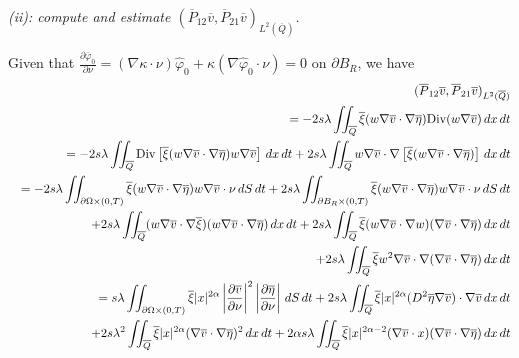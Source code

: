 \documentclass[11pt]{article}
\numberwithin{equation}{section}
\begin{document}
{\it (ii): compute and estimate $(\overline{P}_{12} \overline{v}, \overline{P}_{21} \overline{v})_{L^2(\overline{Q})}$.}

Given that $\frac{\partial \overline{\varphi}_0}{\partial \nu} = (\nabla \kappa \cdot \nu) \widehat{\varphi}_0 + \kappa (\nabla \widehat{\varphi}_0 \cdot \nu) = 0$ on $\partial B_R$, we have
\begin{eqnarray*}
	&&(\overline{P}_{12} \overline{v}, \overline{P}_{21} \overline{v})_{L^2(\overline{Q})}\\
	&&= -2s\lambda \iint_{\overline{Q}} \overline{\xi} (w \nabla \overline{v} \cdot \nabla \overline{\eta}) \text{Div}(w \nabla \overline{v}) \, dx \, dt\\
	&&= -2s\lambda \iint_{\overline{Q}} \text{Div} \left[\overline{\xi} (w \nabla \overline{v} \cdot \nabla \overline{\eta}) w \nabla \overline{v}\right] \, dx \, dt + 2s\lambda \iint_{\overline{Q}} w \nabla \overline{v} \cdot \nabla \left[\overline{\xi} (w \nabla \overline{v} \cdot \nabla \overline{\eta})\right] \, dx \, dt\\
	&&= -2s\lambda \iint_{\partial \Omega \times (0,T)} \overline{\xi} (w \nabla \overline{v} \cdot \nabla \overline{\eta}) w \nabla \overline{v} \cdot \nu \, dS \, dt + 2s\lambda \iint_{\partial B_R \times (0,T)} \overline{\xi} (w \nabla \overline{v} \cdot \nabla \overline{\eta}) w \nabla \overline{v} \cdot \nu \, dS \, dt\\
	&&\hspace{4.5mm} + 2s\lambda \iint_{\overline{Q}} (w \nabla \overline{v} \cdot \nabla \overline{\xi}) (w \nabla \overline{v} \cdot \nabla \overline{\eta}) \, dx \, dt + 2s\lambda \iint_{\overline{Q}} \overline{\xi} (w \nabla \overline{v} \cdot \nabla w) (\nabla \overline{v} \cdot \nabla \overline{\eta}) \, dx \, dt\\
	&&\hspace{4.5mm} + 2s\lambda \iint_{\overline{Q}} \overline{\xi} w^2 \nabla \overline{v} \cdot \nabla (\nabla \overline{v} \cdot \nabla \overline{\eta}) \, dx \, dt\\
	&&= s\lambda \iint_{\partial \Omega \times (0,T)} \overline{\xi} |x|^{2\alpha} \left|\frac{\partial \overline{v}}{\partial \nu}\right|^2 \left|\frac{\partial \overline{\eta}}{\partial \nu}\right| \, dS \, dt + 2s\lambda \iint_{\overline{Q}} \overline{\xi} |x|^{2\alpha} (D^2 \overline{\eta} \nabla \overline{v}) \cdot \nabla \overline{v} \, dx \, dt\\
	&&\hspace{4.5mm} + 2s\lambda^2 \iint_{\overline{Q}} \overline{\xi} |x|^{2\alpha} (\nabla \overline{v} \cdot \nabla \overline{\eta})^2 \, dx \, dt + 2\alpha s\lambda \iint_{\overline{Q}} \overline{\xi} |x|^{2\alpha-2} (\nabla \overline{v} \cdot x) (\nabla \overline{v} \cdot \nabla \overline{\eta}) \, dx \, dt\\

\end{eqnarray*}
\end{document}
